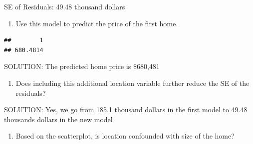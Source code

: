 \documentclass[]{article}
\newenvironment{Shaded}{\begin{snugshade}}{\end{snugshade}}
\newcommand{\KeywordTok}[1]{\textcolor[rgb]{0.13,0.29,0.53}{\textbf{#1}}}
\newcommand{\DataTypeTok}[1]{\textcolor[rgb]{0.13,0.29,0.53}{#1}}
\newcommand{\DecValTok}[1]{\textcolor[rgb]{0.00,0.00,0.81}{#1}}
\newcommand{\StringTok}[1]{\textcolor[rgb]{0.31,0.60,0.02}{#1}}
\newcommand{\OperatorTok}[1]{\textcolor[rgb]{0.81,0.36,0.00}{\textbf{#1}}}
\newcommand{\NormalTok}[1]{#1}
\providecommand{\tightlist}{%
  \setlength{\itemsep}{0pt}\setlength{\parskip}{0pt}}
\begin{document}
SE of Residuals: 49.48 thousand dollars

\begin{enumerate}
\def\labelenumi{\arabic{enumi}.}
\setcounter{enumi}{13}
\tightlist
\item
  Use this model to predict the price of the first home.
\end{enumerate}

\begin{Shaded}
\end{Shaded}

\begin{verbatim}
##        1 
## 680.4814
\end{verbatim}

SOLUTION: The predicted home price is \$680,481

\begin{enumerate}
\def\labelenumi{\arabic{enumi}.}
\setcounter{enumi}{14}
\tightlist
\item
  Does including this additional location variable further reduce the SE
  of the residuals?
\end{enumerate}

SOLUTION: Yes, we go from 185.1 thousand dollars in the first model to
49.48 thousands dollars in the new model

\begin{enumerate}
\def\labelenumi{\arabic{enumi}.}
\setcounter{enumi}{15}
\tightlist
\item
  Based on the scatterplot, is location confounded with size of the
  home?
\end{enumerate}

\begin{Shaded}
\end{Shaded}
\end{document}
